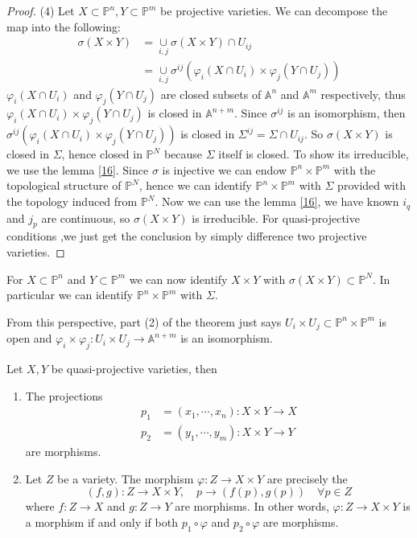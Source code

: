 \begin{proof}
	(4) Let $ X\subset \mathbb{P}^n,Y\subset \mathbb{P}^m $ be projective varieties. We can decompose the map into the following:
	$$\begin{array}{cc}
			\sigma(X\times Y) & =\mathop{\cup}\limits_{i,j}\sigma(X\times Y)\cap U_{ij}                                   \\
			                  & =\mathop{\cup}\limits_{i,j}\sigma^{ij}(\varphi_i(X\cap{U_i})\times \varphi_j(Y\cap{U_j}))
		\end{array}$$
	$ \varphi_i(X\cap U_i) $ and $ \varphi_j(Y\cap U_j) $ are closed subsets of $ \mathbb{A}^n $ and $ \mathbb{A}^m $ respectively, thus $ \varphi_i(X\cap{U_i})\times \varphi_j(Y\cap{U_j}) $ is closed in $ \mathbb{A}^{n+m} $. Since $ \sigma^{ij} $ is an isomorphism, then  $ \sigma^{ij}(\varphi_i(X\cap{U_i})\times \varphi_j(Y\cap{U_j})) $ is closed in $ \Sigma^{ij}=\Sigma\cap U_{ij}$. So $ \sigma(X\times Y) $ is closed in $ \Sigma $, hence closed in $ \mathbb{P}^N $ because $ \Sigma $ itself is closed. To show its irreducible, we use the lemma \ref{16}. Since $ \sigma $ is injective we can endow $ \mathbb{P}^n\times\mathbb{P}^m $ with the topological structure of $ \mathbb{P}^N $, hence we can identify $ \mathbb{P}^n\times\mathbb{P}^m $ with $ \Sigma $ provided with the topology induced from $ \mathbb{P}^N $. Now we can use the lemma \ref{16}, we have known $ i_q $ and $ j_p $ are continuous, so $ \sigma(X\times Y) $ is irreducible. For quasi-projective conditions ,we just get the conclusion by simply difference two projective varieties.
\end{proof}
\begin{remark}
	For $ X\subset \mathbb{P}^n $ and $ Y\subset\mathbb{P}^m $ we can now identify $ X\times Y $ with $ \sigma(X\times Y)\subset \mathbb{P}^N$. In particular we can identify $ \mathbb{P}^n\times\mathbb{P}^m $ with $ \Sigma $.

	From this perspective, part (2) of the theorem just says $ U_i\times U_j\subset \mathbb{P}^n\times \mathbb{P}^m $ is open and $ \varphi_i\times \varphi_j:U_i\times U_j\to \mathbb{A}^{n+m} $ is an isomorphism.
\end{remark}
\begin{proposition}
	Let $ X,Y $ be quasi-projective varieties, then
	\begin{enumerate}
		\item The projections
		      $$\begin{array}{cc}
				      p_1 & =(x_1,\cdots,x_n): X\times Y\to X \\
				      p_2 & =(y_1,\cdots,y_m): X\times Y\to Y
			      \end{array}$$
		      are morphisms.
		\item Let $ Z $ be a variety. The morphism $ \varphi : Z\to X \times Y $ are precisely the
		      $$
			      (f,g):Z\to X\times Y,\quad p\to (f(p),g(p))\quad\forall p\in Z
		      $$
		      where $ f:Z\to X $ and $ g:Z\to Y $ are morphisms. In other words, $ \varphi:Z\to X\times Y $ is a morphism if and only if both $ p_1\circ \varphi $ and $ p_2\circ\varphi  $ are morphisms.
	\end{enumerate}
\end{proposition}
